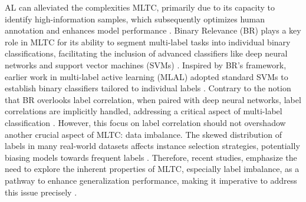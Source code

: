 \documentclass[letterpaper]{article} %
\begin{document}
AL can alleviated the complexities MLTC, primarily due to its capacity to identify high-information samples, which subsequently optimizes human annotation and enhances model performance \citep{REYES2018494, 10.1145/3379504}.
Binary Relevance (BR) plays a key role in MLTC for its ability to segment multi-label tasks into individual binary classifications, facilitating the inclusion of advanced classifiers like deep neural networks and support vector machines (SVMs) \cite{Zhang2018}. 
Inspired by BR's framework, earlier work in multi-label active learning (MLAL) adopted standard SVMs to establish binary classifiers tailored to individual labels \cite{mmc2009, adaptive2013, Cherman2019}.
Contrary to the notion that BR overlooks label correlation, when paired with deep neural networks, label correlations are implicitly handled, addressing a critical aspect of multi-label classification \cite{Su2021}. 
However, this focus on label correlation should not overshadow another crucial aspect of MLTC: data imbalance. The skewed distribution of labels in many real-world datasets affects instance selection strategies, potentially biasing models towards frequent labels \cite{Wu_Lyu_Ghanem_2016}. 
Therefore, recent studies, emphasize the need to explore the inherent properties of MLTC, especially label imbalance, as a pathway to enhance generalization performance, making it imperative to address this issue 
 precisely \cite{Zhang2018}.
\end{document}
